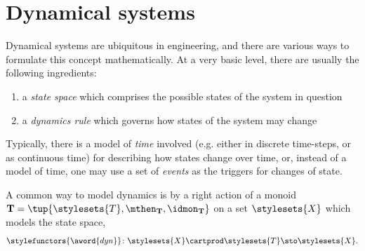 

\section{Dynamical systems}
\label{sec:dynamical-systems}

Dynamical systems are ubiquitous in engineering, and there are various ways to formulate this concept mathematically.
At a very basic level, there are usually the following ingredients:
\begin{enumerate}
    \item a \emph{state space} which comprises the possible states of the system in question
    \item a \emph{dynamics rule} which governs how states of the system may change
\end{enumerate}
Typically, there is a model of \emph{time} involved (e.g. either in discrete time-steps, or as continuous time) for describing how states change over time, or, instead of a model of time, one may use a set of \emph{events} as the triggers for changes of state.

A common way to model dynamics is by a right action of a monoid $\mathbf{T} = \tup{\stylesets{T}, \mthen_{\mathbf{T}}, \idmon_{\mathbf{T}}}$ on a set $\stylesets{X}$ which models the state space,
\begin{equation}
    \stylefunctors{\aword{dyn}} \colon  \stylesets{X} \cartprod \stylesets{T} \sto \stylesets{X}.
\end{equation}


